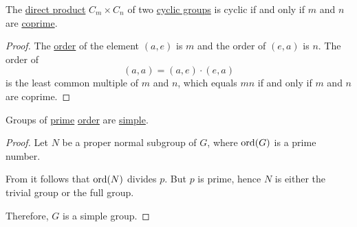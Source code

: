 \begin{proposition}\label{thn:product_of_cyclic_groups}
  The \hyperref[def:monoid_direct_product]{direct product} \( C_m \times C_n \) of two \hyperref[def:cyclic_group]{cyclic groups} is cyclic if and only if \( m \) and \( n \) are \hyperref[def:coprime_numbers]{coprime}.
\end{proposition}
\begin{proof}
  The \hyperref[def:group_order]{order} of the element \( (a, e) \) is \( m \) and the order of \( (e, a) \) is \( n \). The order of
  \begin{equation*}
    (a, a) = (a, e) \cdot (e, a)
  \end{equation*}
  is the least common multiple of \( m \) and \( n \), which equals \( mn \) if and only if \( m \) and \( n \) are coprime.
\end{proof}

\begin{proposition}\label{thm:cyclic_groups_are_simple}
  Groups of \hyperref[def:prime_number]{prime} \hyperref[def:group_order]{order} are \hyperref[def:group/simple]{simple}.
\end{proposition}
\begin{proof}
  Let \( N \) be a proper normal subgroup of \( G \), where \( \operatorname{ord}(G) \) is a prime number.

  From  it follows that \( \operatorname{ord}(N) \) divides \( p \). But \( p \) is prime, hence \( N \) is either the trivial group or the full group.

  Therefore, \( G \) is a simple group.
\end{proof}

